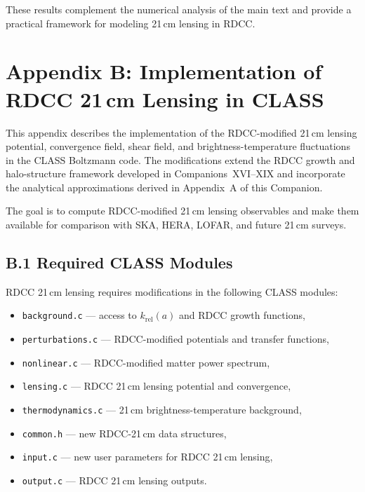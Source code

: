\documentclass[11pt,a4paper]{article}
\begin{document}
These results complement the numerical analysis of the main text and provide a practical
framework for modeling 21\,cm lensing in RDCC.

\section*{Appendix B: Implementation of RDCC 21\,cm Lensing in CLASS}

This appendix describes the implementation of the RDCC-modified 21\,cm lensing potential,
convergence field, shear field, and brightness-temperature fluctuations in the CLASS Boltzmann
code. The modifications extend the RDCC growth and halo-structure framework developed in
Companions~XVI–XIX and incorporate the analytical approximations derived in Appendix~A of
this Companion.

The goal is to compute RDCC-modified 21\,cm lensing observables and make them available
for comparison with SKA, HERA, LOFAR, and future 21\,cm surveys.

\subsection*{B.1 Required CLASS Modules}

RDCC 21\,cm lensing requires modifications in the following CLASS modules:

\begin{itemize}
\item \texttt{background.c} — access to $k_{\mathrm{rel}}(a)$ and RDCC growth functions,
\item \texttt{perturbations.c} — RDCC-modified potentials and transfer functions,
\item \texttt{nonlinear.c} — RDCC-modified matter power spectrum,
\item \texttt{lensing.c} — RDCC 21\,cm lensing potential and convergence,
\item \texttt{thermodynamics.c} — 21\,cm brightness-temperature background,
\item \texttt{common.h} — new RDCC-21\,cm data structures,
\item \texttt{input.c} — new user parameters for RDCC 21\,cm lensing,
\item \texttt{output.c} — RDCC 21\,cm lensing outputs.
\end{itemize}
\end{document}
